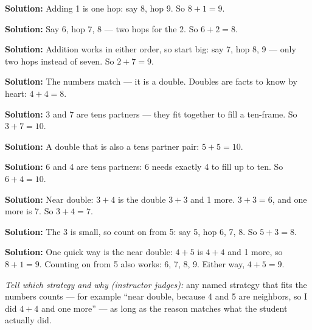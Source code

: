 \documentclass[12pt]{article}
\begin{document}




\textbf{Solution:} Adding 1 is one hop: say 8, hop 9. So $8+1=9$. 


\textbf{Solution:} Say 6, hop 7, 8 --- two hops for the 2. So $6+2=8$.


\textbf{Solution:} Addition works in either order, so start big: say 7, hop
8, 9 --- only two hops instead of seven. So $2+7=9$. 


\textbf{Solution:} The numbers match --- it is a double. Doubles are facts
to know by heart: $4+4=8$. 


\textbf{Solution:} 3 and 7 are tens partners --- they fit together to fill a
ten-frame. So $3+7=10$. 


\textbf{Solution:} A double that is also a tens partner pair: $5+5=10$.


\textbf{Solution:} 6 and 4 are tens partners: 6 needs exactly 4 to fill up
to ten. So $6+4=10$. 


\textbf{Solution:} Near double: $3+4$ is the double $3+3$ and 1 more.
$3+3=6$, and one more is 7. So $3+4=7$. 


\textbf{Solution:} The 3 is small, so count on from 5: say 5, hop 6, 7, 8.
So $5+3=8$. 


\textbf{Solution:} One quick way is the near double: $4+5$ is $4+4$ and 1
more, so $8+1=9$. Counting on from 5 also works: 6, 7, 8, 9. Either way,
$4+5=9$. 

\emph{Tell which strategy and why (instructor judges):} any named strategy
that fits the numbers counts --- for example ``near double, because 4 and 5
are neighbors, so I did $4+4$ and one more'' --- as long as the reason
matches what the student actually did.
\end{document}
